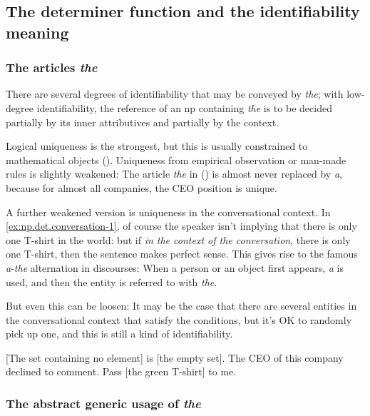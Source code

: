 \documentclass[UTF8, a4paper, oneside, scheme=plain]{ctexrep}
\newcommand{\corpus}[1]{\emph{#1}}
\begin{document}
\subsection{The determiner function and the identifiability meaning}\label{sec:np.det.definite}

\subsubsection{The articles \corpus{the}}

There are several degrees of identifiability that may be conveyed by \corpus{the};
with low-degree identifiability, 
the reference of an \acs{np} containing \corpus{the} is 
to be decided partially by its inner attributives and partially by the context.

Logical uniqueness is the strongest, 
but this is usually constrained to mathematical objects
().
Uniqueness from empirical observation or man-made rules is slightly weakened:
The article \corpus{the} in ()
is almost never replaced by \corpus{a},
because for almost all companies,
the CEO position is unique.

A further weakened version is uniqueness in the conversational context.
In \eqref{ex:np.det.conversation-1}, 
of course the speaker isn't implying that there is only one T-shirt in the world:
but if \emph{in the context of the conversation},
there is only one T-shirt,
then the sentence makes perfect sense.
This gives rise to the famous \corpus{a}-\corpus{the} alternation in discourses:
When a person or an object first appears,
\corpus{a} is used,
and then the entity is referred to with \corpus{the}.

But even this can be loosen:
It may be the case that there are several entities in the conversational context
that satisfy the conditions,
but it's OK to randomly pick up one,
and this is still a kind of identifiability.

\begin{exe}
    \ex\label{ex:np.det.math-1} [The set containing no element] is [the empty set].
    \ex\label{ex:np.det.decline-to-comment} The CEO of this company declined to comment.
    \ex\label{ex:np.det.conversation-1} Pass [the green T-shirt] to me.
\end{exe}

\subsubsection{The abstract generic usage of \corpus{the}}
\end{document}
